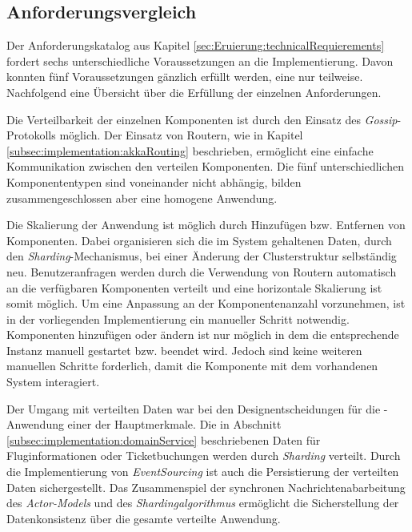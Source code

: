 \subsection{Anforderungsvergleich}
Der Anforderungskatalog aus Kapitel \ref{sec:Eruierung:technicalRequierements} fordert sechs unterschiedliche Voraussetzungen an die Implementierung. Davon konnten fünf Voraussetzungen gänzlich erfüllt werden, eine nur teilweise. \\
Nachfolgend eine Übersicht über die Erfüllung der einzelnen Anforderungen.
\begin{enumerate}
  Die Verteilbarkeit der einzelnen Komponenten ist durch den Einsatz des \textit{Gossip}-Protokolls möglich. Der Einsatz von Routern, wie in Kapitel \ref{subsec:implementation:akkaRouting} beschrieben, ermöglicht eine einfache Kommunikation zwischen den verteilen Komponenten. Die fünf unterschiedlichen Komponententypen sind voneinander nicht abhängig, bilden zusammengeschlossen aber eine homogene Anwendung.

  Die Skalierung der Anwendung ist möglich durch Hinzufügen bzw. Entfernen von Komponenten. Dabei organisieren sich die im System gehaltenen Daten, durch den \textit{Sharding}-Mechanismus, bei einer Änderung der Clusterstruktur selbständig neu. Benutzeranfragen werden durch die Verwendung von Routern automatisch an die verfügbaren Komponenten verteilt und eine horizontale Skalierung ist somit möglich. Um eine Anpassung an der Komponentenanzahl vorzunehmen, ist in der vorliegenden Implementierung ein manueller Schritt notwendig. Komponenten hinzufügen oder ändern ist nur möglich in dem die entsprechende Instanz manuell gestartet bzw. beendet wird. Jedoch sind keine weiteren manuellen Schritte forderlich, damit die Komponente mit dem vorhandenen System interagiert. 

  Der Umgang mit verteilten Daten war bei den Designentscheidungen für die -Anwendung einer der Hauptmerkmale. Die in Abschnitt \ref{subsec:implementation:domainService} beschriebenen Daten für Fluginformationen oder Ticketbuchungen werden durch \textit{Sharding} verteilt. Durch die Implementierung von \textit{EventSourcing} ist auch die Persistierung der verteilten Daten sichergestellt. Das Zusammenspiel der synchronen Nachrichtenabarbeitung des \textit{Actor-Models} und des \textit{Shardingalgorithmus} ermöglicht die Sicherstellung der Datenkonsistenz über die gesamte verteilte Anwendung.
  

\end{enumerate}
